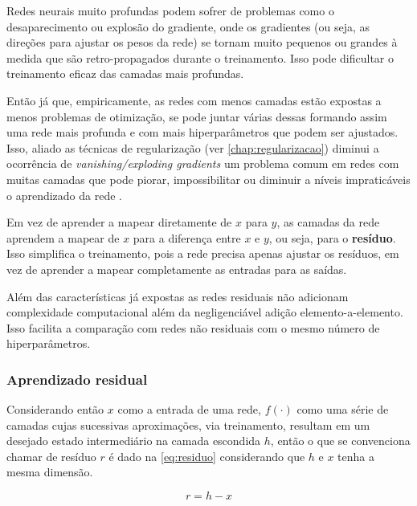 			\par Redes neurais muito profundas podem sofrer de problemas como o desaparecimento ou explosão do gradiente, onde os gradientes (ou seja, as direções para ajustar os pesos da rede) se tornam muito pequenos ou grandes à medida que são retro-propagados durante o treinamento. Isso pode dificultar o treinamento eficaz das camadas mais profundas.

			\par Então já que, empiricamente, as redes com menos camadas estão expostas a menos problemas de otimização, se pode juntar várias dessas formando assim uma rede mais profunda e com mais hiperparâmetros que podem ser ajustados. Isso, aliado as técnicas de regularização (ver \autoref{chap:regularizacao}) diminui a ocorrência de \textit{vanishing/exploding gradients} um problema comum em redes com muitas camadas que pode piorar, impossibilitar ou diminuir a níveis impraticáveis o aprendizado da rede \cite{DBLP:journals/corr/HeZRS15}. 
			
			\par Em vez de aprender a mapear diretamente de $x$ para $y$, as camadas da rede aprendem a mapear de $x$ para a diferença entre $x$ e $y$, ou seja, para o \textbf{resíduo}. Isso simplifica o treinamento, pois a rede precisa apenas ajustar os resíduos, em vez de aprender a mapear completamente as entradas para as saídas.
			
			\par Além das características já expostas as redes residuais não adicionam complexidade computacional além da negligenciável adição elemento-a-elemento. Isso facilita a comparação com redes não residuais com o mesmo número de hiperparâmetros.
			
			\subsubsection{Aprendizado residual}
			
				\par Considerando então $x$ como a entrada de uma rede, $f(\cdot)$ como uma série de camadas cujas sucessivas aproximações, via treinamento, resultam em um desejado  estado intermediário na camada escondida $h$, então o que se convenciona chamar de resíduo $r$ é dado na \autoref{eq:residuo} considerando que $h$ e $x$ tenha a mesma dimensão.
				
				
				\begin{equation}
					\label{eq:residuo}
					r = h - x
				\end{equation}
			
